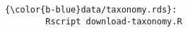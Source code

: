 \documentclass[class=minimal,border=0]{standalone}
\begin{document}
%
\begin{BVerbatim}[bgcolor=b-darkgrey]
{\color{b-blue}data/taxonomy.rds}:
        Rscript download-taxonomy.R
\end{BVerbatim}
\end{document}
